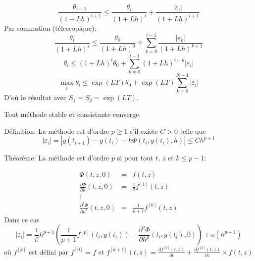 \documentclass{beamer}
\begin{document}
 
 \begin{frame}

\[\frac{\theta_{i+1}}{(1+L h)^{i+1}}\leq  \frac{\theta_{i}}{(1+L h)^{i}} +\frac{|\varepsilon_i|}{(1+L h)^{i+1}}\]
Par sommation (télescopique):
\[\frac{\theta_{i}}{(1+L h)^{i}}\leq  \frac{\theta_{0}}{(1+L h)^{0}} +\sum_{k=0}^{i-1}\frac{|\varepsilon_k|}{(1+L h)^{k+1}}\]
\[\theta_{i}\leq  (1+L h)^{i}\theta_{0} +\sum_{k=0}^{i-1}(1+L h)^{i-k}|\varepsilon_i|\]
\[\max_i\theta_{i}\leq  \exp(L T)\theta_{0} +\exp(L T)\sum_{k=0}^{N-1}|\varepsilon_i|\]
D'où le résultat avec $S_1=S_2=\exp(L T)$.
\begin{theorem}
Tout méthode stable et consistante converge. %
\end{theorem}
 \end{frame}
   

\begin{frame}

 \begin{block}{Définition: La méthode est d'ordre $p\geq 1$ s'il existe  $C>0$ telle que}
\[\left|\varepsilon_{i}\right|=\left|y(t_{i+1})-y(t_{i})-h \Phi(t_i,y(t_i),h)\right|\leq C h^{p+1}\]
\end{block}
\begin{block}{Théorème: La méthode est d'ordre $p$ si pour tout $t$, $z$ et $k\leq p-1$:}
 
\[\begin{array}{lcl}
\Phi(t,z,0)&=&f(t,z)\\
\displaystyle{\frac{\partial \Phi}{\partial h}}(t,z,0)&=&\displaystyle{\frac 12 f^{[1]}(t,z)}\\
\vdots && \\
\displaystyle{\frac{\partial^k \Phi}{\partial h^k}(t,z,0)}&=& \displaystyle{\frac 1{k+1} f^{[k]}(t,z)}
\end{array}\]
Dans ce cas
\[|\varepsilon_i|=\frac 1{i!}h^{p+1}\left(\frac 1{p+1} f^{[p]}(t_i,y(t_i))-\frac{\partial^p \Phi}{\partial h^p}(t_i,y(t_i),0)\right)+o(h^{p+1})\]
où $f^{[k]}$ est défini par $f^{[0]}=f$ et $f^{[k+1]}(t,z)=\frac{\partial f^{[k]}(t,z)}{\partial t}+\frac{\partial f^{[k]}(t,z)}{\partial z}\times f(t,z)$

\end{block}

 \end{frame}
   
\end{document}
